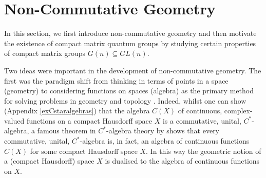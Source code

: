 \documentclass{article}
\theoremstyle{plain}
\newtheorem{theorem}{Theorem}[section]
\newtheorem{proposition}[theorem]{Proposition}
\theoremstyle{definition}
\theoremstyle{remark}
\begin{document}
\section{Non-Commutative Geometry} \label{noncommgeometry}

In this section, we first introduce non-commutative geometry 
and then motivate the existence of compact matrix quantum groups 
by studying certain properties of compact matrix groups $G(n) \subseteq GL(n)$.

Two ideas were important in the development of non-commutative geometry.
The first was the paradigm shift 
from thinking in terms of points in a space (geometry)
to considering functions on spaces (algebra)
as the primary method for solving problems in geometry and topology 
\citep{Budzyński1995, Majid2000, Sitarz2013}.
Indeed, whilst one can show 
(Appendix \ref{exCstaralgebras}) 
that the algebra $C(X)$ of 
continuous, complex-valued functions on a compact Hausdorff space $X$ 
is a commutative, unital, $C^{*}$-algebra,
a famous theorem in $C^{*}$-algebra theory by \citet{gelfand1943}
shows that every commutative, unital, $C^{*}$-algebra is, in fact, an algebra of continuous
functions $C(X)$ for some compact Hausdorff space $X$.
In this way the geometric notion of a (compact Hausdorff) space $X$ is dualised to the algebra of continuous functions on $X$.
\end{document}
